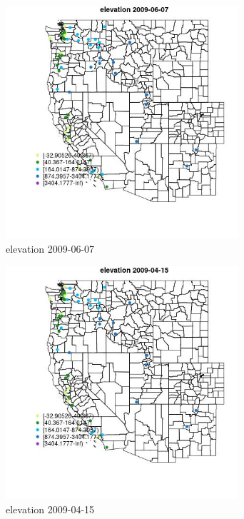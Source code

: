 \begin{figure} 
\centering  
\includegraphics[width=0.77\textwidth]{Code_Outputs/Report_ML_input_PM25_Step4_part_e_de_duplicated_aves_MapObselevation2009-06-07.jpg} 
\caption{\label{fig:Report_ML_input_PM25_Step4_part_e_de_duplicated_avesMapObselevation2009-06-07}elevation 2009-06-07} 
\end{figure} 
 

\clearpage 

\begin{figure} 
\centering  
\includegraphics[width=0.77\textwidth]{Code_Outputs/Report_ML_input_PM25_Step4_part_e_de_duplicated_aves_MapObselevation2009-04-15.jpg} 
\caption{\label{fig:Report_ML_input_PM25_Step4_part_e_de_duplicated_avesMapObselevation2009-04-15}elevation 2009-04-15} 
\end{figure} 
 

